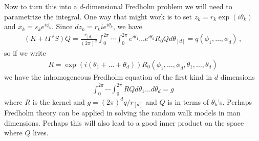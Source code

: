 Now to turn this into a $d$-dimensional Fredholm problem we will need to parametrize the integral. One way that might work is to set $z_k = r_k \exp(i\theta_k)$ and $x_k = s_k e^{i\phi_k}$. Since $dz_k = r_k i e^{i\theta_k}$, we have
\begin{align}
(K+t\Gamma'S)Q = \frac{r_{[d]}}{(2\pi)^d}\int_0^{2\pi}\cdots\int_0^{2\pi} e^{i\theta_1}\ldots e^{i\theta_d}R_0Q d\theta_{[d]} = q(\phi_1,\ldots,\phi_d)\,,
\end{align}
so if we write
\begin{align}
R = \exp(i(\theta_1+\ldots + \theta_d))R_0(\phi_1,\ldots,\phi_d,\theta_1,\ldots,\theta_d)
\end{align}
we have the inhomogeneous Fredholm equation of the first kind in $d$ dimensions
\begin{align}
	\int_0^{2\pi}\cdots\int_0^{2\pi} RQ d\theta_1\ldots d\theta_d= g
\end{align}
where $R$ is the kernel and $g = (2\pi)^dq/r_{[d]}$ and $Q$ is in terms of $\theta_k$'s. Perhaps Fredholm theory can be applied in solving the random walk models in man dimensions. Perhaps this will also lead to a good inner product on the space where $Q$ lives.


